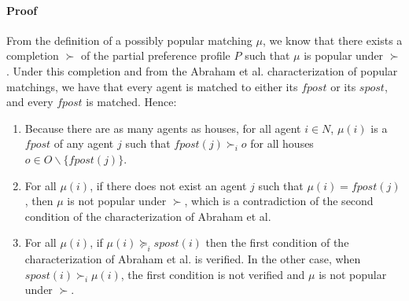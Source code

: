\documentclass{article}
\begin{document}
\paragraph{Proof}






From the definition of a possibly popular matching $\mu $, we know that there exists a completion $\succ$ of the partial preference profile $P$ such that $\mu$ is popular under $\succ$.
Under this completion and from the Abraham et al. characterization of popular matchings, we have that every agent is matched to either its $fpost$ or its $spost$, and every $fpost$ is matched.
Hence:
\begin{enumerate}
    \item Because there are as many agents as houses, for all agent $i \in N$, $\mu(i)$ is a $fpost$ of any agent $j$ such that $fpost(j) \succ_i o$ for all houses $o \in O \backslash \{fpost(j)\}$.
    \item For all $\mu(i)$, if there does not exist an agent $j$ such that $\mu(i) = fpost(j)$, then $\mu$ is not popular under $\succ$, which is a contradiction of the second condition of the characterization of Abraham et al.
    \item For all $\mu(i)$, if $\mu(i) \succeq_i spost(i)$ then the first condition of the characterization of Abraham et al. is verified. In the other case, when $spost(i) \succ_i \mu(i)$, the first condition is not verified and $\mu$ is not popular under $\succ$.
\end{enumerate}
\end{document}
